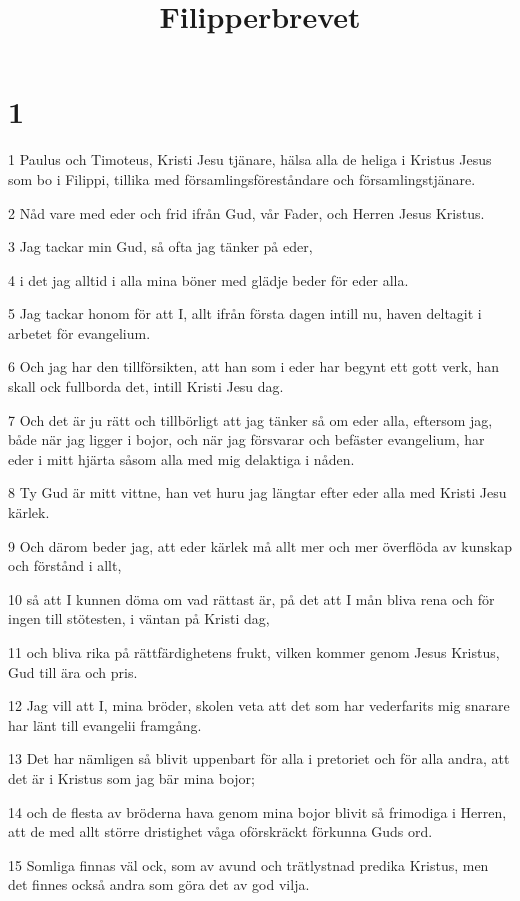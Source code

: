 

\title{Filipperbrevet}


\chapter{1}

\par 1 Paulus och Timoteus, Kristi Jesu tjänare, hälsa alla de heliga i Kristus Jesus som bo i Filippi, tillika med församlingsföreståndare och församlingstjänare.
\par 2 Nåd vare med eder och frid ifrån Gud, vår Fader, och Herren Jesus Kristus.
\par 3 Jag tackar min Gud, så ofta jag tänker på eder,
\par 4 i det jag alltid i alla mina böner med glädje beder för eder alla.
\par 5 Jag tackar honom för att I, allt ifrån första dagen intill nu, haven deltagit i arbetet för evangelium.
\par 6 Och jag har den tillförsikten, att han som i eder har begynt ett gott verk, han skall ock fullborda det, intill Kristi Jesu dag.
\par 7 Och det är ju rätt och tillbörligt att jag tänker så om eder alla, eftersom jag, både när jag ligger i bojor, och när jag försvarar och befäster evangelium, har eder i mitt hjärta såsom alla med mig delaktiga i nåden.
\par 8 Ty Gud är mitt vittne, han vet huru jag längtar efter eder alla med Kristi Jesu kärlek.
\par 9 Och därom beder jag, att eder kärlek må allt mer och mer överflöda av kunskap och förstånd i allt,
\par 10 så att I kunnen döma om vad rättast är, på det att I mån bliva rena och för ingen till stötesten, i väntan på Kristi dag,
\par 11 och bliva rika på rättfärdighetens frukt, vilken kommer genom Jesus Kristus, Gud till ära och pris.
\par 12 Jag vill att I, mina bröder, skolen veta att det som har vederfarits mig snarare har länt till evangelii framgång.
\par 13 Det har nämligen så blivit uppenbart för alla i pretoriet och för alla andra, att det är i Kristus som jag bär mina bojor;
\par 14 och de flesta av bröderna hava genom mina bojor blivit så frimodiga i Herren, att de med allt större dristighet våga oförskräckt förkunna Guds ord.
\par 15 Somliga finnas väl ock, som av avund och trätlystnad predika Kristus, men det finnes också andra som göra det av god vilja.
